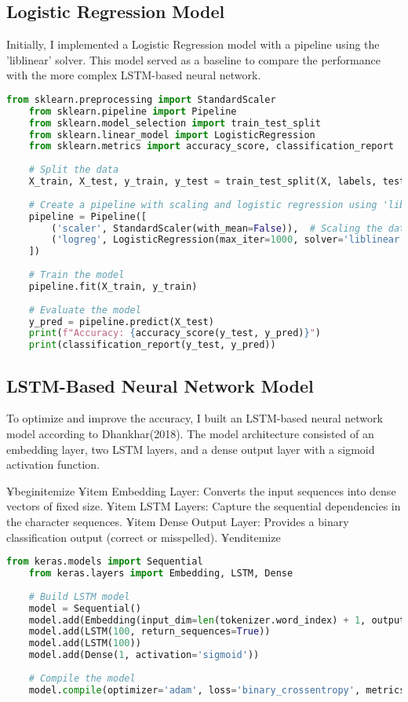\subsection{Logistic Regression Model}
Initially, I implemented a Logistic Regression model with a pipeline using the 'liblinear' solver. This model served as a baseline to compare the performance with the more complex LSTM-based neural network.
\begin{lstlisting}[language=Python, caption=Data Collection and Preprocessing]
    from sklearn.preprocessing import StandardScaler
    from sklearn.pipeline import Pipeline
    from sklearn.model_selection import train_test_split
    from sklearn.linear_model import LogisticRegression
    from sklearn.metrics import accuracy_score, classification_report
    
    # Split the data
    X_train, X_test, y_train, y_test = train_test_split(X, labels, test_size=0.2, random_state=42)
    
    # Create a pipeline with scaling and logistic regression using 'liblinear' solver
    pipeline = Pipeline([
        ('scaler', StandardScaler(with_mean=False)),  # Scaling the data
        ('logreg', LogisticRegression(max_iter=1000, solver='liblinear'))  # Use 'liblinear' solver
    ])
    
    # Train the model
    pipeline.fit(X_train, y_train)
    
    # Evaluate the model
    y_pred = pipeline.predict(X_test)
    print(f"Accuracy: {accuracy_score(y_test, y_pred)}")
    print(classification_report(y_test, y_pred))
\end{lstlisting}


\subsection{LSTM-Based Neural Network Model}
To optimize and improve the accuracy, I built an LSTM-based neural network model according to Dhankhar(2018). The model architecture consisted of an embedding layer, two LSTM layers, and a dense output layer with a sigmoid activation function.

¥begin{itemize}
    ¥item Embedding Layer: Converts the input sequences into dense vectors of fixed size.
    ¥item LSTM Layers: Capture the sequential dependencies in the character sequences.
    ¥item Dense Output Layer: Provides a binary classification output (correct or misspelled).
¥end{itemize}

\begin{lstlisting}[language=Python, caption=Data Collection and Preprocessing]
    from keras.models import Sequential
    from keras.layers import Embedding, LSTM, Dense
    
    # Build LSTM model
    model = Sequential()
    model.add(Embedding(input_dim=len(tokenizer.word_index) + 1, output_dim=50, input_length=max_seq_length))
    model.add(LSTM(100, return_sequences=True))
    model.add(LSTM(100))
    model.add(Dense(1, activation='sigmoid'))
    
    # Compile the model
    model.compile(optimizer='adam', loss='binary_crossentropy', metrics=['accuracy'])
    
\end{lstlisting}

